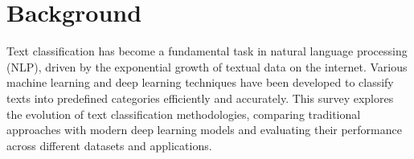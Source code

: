 \documentclass[conference]{IEEEtran}
\begin{document}
%



\section{Background}

Text classification has become a fundamental task in natural language processing (NLP), driven by the exponential growth of textual data on the internet. Various machine learning and deep learning techniques have been developed to classify texts into predefined categories efficiently and accurately. This survey explores the evolution of text classification methodologies, comparing traditional approaches with modern deep learning models and evaluating their performance across different datasets and applications.
\end{document}
